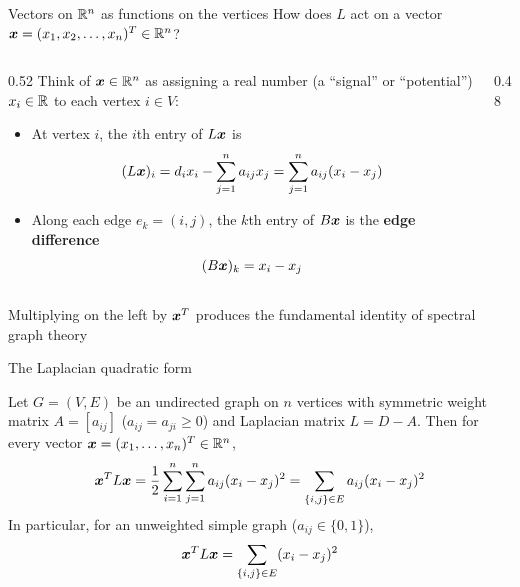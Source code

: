 \documentclass[aspectratio=169]{beamer}\usepackage[]{graphicx}\usepackage[]{xcolor}
\begin{document}
\begin{frame}{Vectors on $\mathbb{R}^n$ as functions on the vertices}
How does $L$ act on a vector $\bm{x} = (x_1, x_2, \ldots, x_n)^T \in \mathbb{R}^n$?
\vfill
\begin{columns}[c]
\begin{column}{0.52\textwidth}
Think of $\bm{x} \in \mathbb{R}^n$ as assigning a real number (a ``signal'' or ``potential'') $x_i \in \mathbb{R}$ to each vertex $i \in V$:
\begin{itemize}
\item At vertex $i$, the $i$th entry of $L\bm{x}$ is
\[
(L\bm{x})_i = d_i x_i - \sum_{j=1}^n a_{ij} x_j = \sum_{j=1}^n a_{ij}(x_i - x_j)
\]
\item Along each edge $e_k = (i, j)$, the $k$th entry of $B\bm{x}$ is the \textbf{edge difference}
\[
(B\bm{x})_k = x_i - x_j
\]
\end{itemize}
\end{column}
\begin{column}{0.48\textwidth}
\centering
{}
\end{column}
\end{columns}
\vfill
Multiplying on the left by $\bm{x}^T$ produces the fundamental identity of spectral graph theory
\end{frame}


\begin{frame}{The Laplacian quadratic form}
\begin{theorem}
\label{th:laplacian-quadratic-form}
Let $G = (V, E)$ be an undirected graph on $n$ vertices with symmetric weight matrix $A = [a_{ij}]$ ($a_{ij} = a_{ji} \ge 0$) and Laplacian matrix $L = D - A$. Then for every vector $\bm{x} = (x_1, \ldots, x_n)^T \in \mathbb{R}^n$,
\[
\bm{x}^T L \bm{x} = \frac{1}{2} \sum_{i=1}^n \sum_{j=1}^n a_{ij}(x_i - x_j)^2 = \sum_{\{i, j\} \in E} a_{ij}(x_i - x_j)^2
\]
In particular, for an unweighted simple graph ($a_{ij} \in \{0, 1\}$),
\[
\bm{x}^T L \bm{x} = \sum_{\{i, j\} \in E} (x_i - x_j)^2
\]
\end{theorem}
\end{frame}
\end{document}

